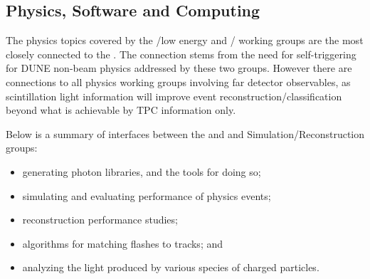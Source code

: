 \subsection{Physics, Software and Computing}


The physics topics covered by the %
/low energy and / working groups are the most closely connected to the \single {}. The connection stems from the need for self-triggering for DUNE non-beam physics addressed by these two groups. 
However there are connections to all physics working groups involving far detector observables, as scintillation light information will improve event reconstruction/classification beyond what is achievable by TPC information only. 




Below is a summary of interfaces between the \dune \single {} and  and  Simulation/Reconstruction groups:

\begin{itemize}
    \item generating photon libraries, and the tools for doing so;
    \item simulating and evaluating performance of physics events;
    \item \single {} reconstruction performance studies;
    \item algorithms for matching flashes to  tracks; and
    \item analyzing the light produced by various species of charged particles.
\end{itemize}




